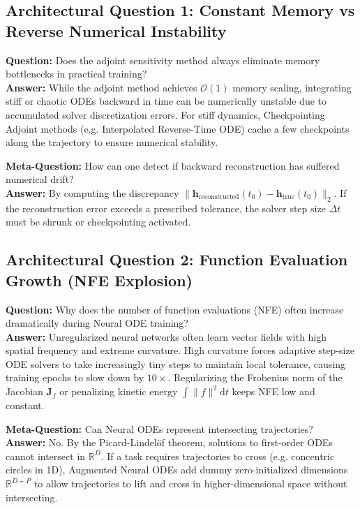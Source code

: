 \documentclass[11pt,a4paper]{article}
\theoremstyle{definition}
\begin{document}
\subsection{Architectural Question 1: Constant Memory vs Reverse Numerical Instability}
\textbf{Question:} Does the adjoint sensitivity method always eliminate memory bottlenecks in practical training?\\
\textbf{Answer:} While the adjoint method achieves $\mathcal{O}(1)$ memory scaling, integrating stiff or chaotic ODEs backward in time can be numerically unstable due to accumulated solver discretization errors. For stiff dynamics, Checkpointing Adjoint methods (e.g. Interpolated Reverse-Time ODE) cache a few checkpoints along the trajectory to ensure numerical stability.

\textbf{Meta-Question:} How can one detect if backward reconstruction has suffered numerical drift?\\
\textbf{Answer:} By computing the discrepancy $\|\mathbf{h}_{\text{reconstructed}}(t_0) - \mathbf{h}_{\text{true}}(t_0)\|_2$. If the reconstruction error exceeds a prescribed tolerance, the solver step size $\Delta t$ must be shrunk or checkpointing activated.

\subsection{Architectural Question 2: Function Evaluation Growth (NFE Explosion)}
\textbf{Question:} Why does the number of function evaluations (NFE) often increase dramatically during Neural ODE training?\\
\textbf{Answer:} Unregularized neural networks often learn vector fields with high spatial frequency and extreme curvature. High curvature forces adaptive step-size ODE solvers to take increasingly tiny steps to maintain local tolerance, causing training epochs to slow down by $10\times$. Regularizing the Frobenius norm of the Jacobian $\mathbf{J}_f$ or penalizing kinetic energy $\int \|f\|^2 \mathrm{d}t$ keeps NFE low and constant.

\textbf{Meta-Question:} Can Neural ODEs represent intersecting trajectories?\\
\textbf{Answer:} No. By the Picard-Lindel\"of theorem, solutions to first-order ODEs cannot intersect in $\mathbb{R}^D$. If a task requires trajectories to cross (e.g. concentric circles in 1D), Augmented Neural ODEs add dummy zero-initialized dimensions $\mathbb{R}^{D + P}$ to allow trajectories to lift and cross in higher-dimensional space without intersecting.
\end{document}
